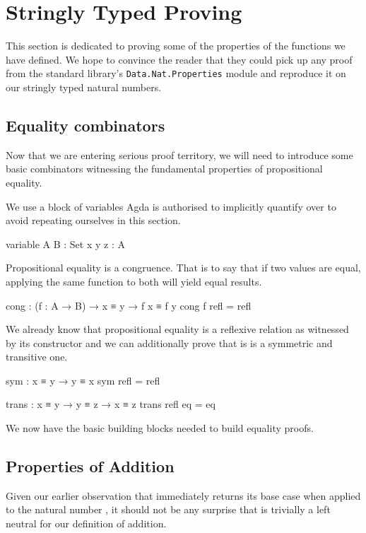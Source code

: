 \documentclass[twocolumn]{article}
\begin{document}
\section{Stringly Typed Proving}

This section is dedicated to proving some of the properties of the
functions we have defined. We hope to convince the reader that they
could pick up any proof from the standard library's
\texttt{Data.Nat.Properties} module and reproduce it on our stringly
typed natural numbers.

\subsection{Equality combinators}

Now that we are entering serious proof territory,
we will need to introduce some basic combinators witnessing the
fundamental properties of propositional equality.

We use a block of variables Agda is authorised to implicitly quantify over
to avoid repeating ourselves in this section.

\begin{code}
variable
  A B : Set
  x y z : A
\end{code}

Propositional equality is a congruence. That is to say that if two values
are equal, applying the same function to both will yield equal results.

\begin{code}
cong : (f : A → B) → x ≡ y → f x ≡ f y
cong f refl = refl
\end{code}

We already know that propositional equality is a reflexive relation as
witnessed by its constructor  and we can additionally prove that
is is a symmetric and transitive one.

\begin{code}
sym : x ≡ y → y ≡ x
sym refl = refl

trans : x ≡ y → y ≡ z → x ≡ z
trans refl eq = eq
\end{code}

We now have the basic building blocks needed to build equality proofs.

\subsection{Properties of Addition}

Given our earlier observation that  immediately returns its
base case when applied to the natural number , it should not be
any surprise that  is trivially a left neutral for
our definition of addition.
\end{document}
